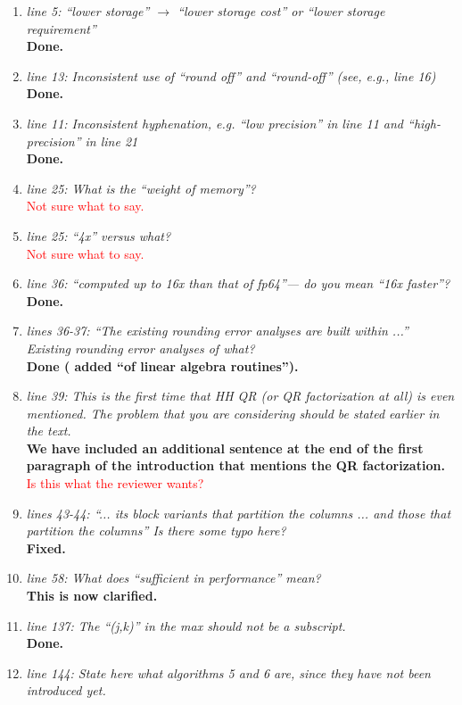 \documentclass[final,onefignum,onetabnum]{siamart190516}
\newcommand{\red}[1]{\textcolor{red}{#1}}
\begin{document}
\begin{enumerate}
    \item {\it line 5: ``lower storage'' $\rightarrow$ ``lower storage cost'' or ``lower storage requirement'' }\\
    {\bf Done.}
    \item {\it line 13: Inconsistent use of ``round off'' and ``round-off'' (see, e.g., line 16) }\\
    {\bf Done.}
    \item {\it line 11: Inconsistent hyphenation, e.g. ``low precision'' in line 11 and ``high-precision'' in line 21 }\\
    {\bf Done.}
    \item {\it line 25: What is the ``weight of memory''? }\\
    \red{Not sure what to say.}
    \item {\it line 25: ``4x'' versus what? }\\
    \red{Not sure what to say.}
    \item {\it line 36: ``computed up to 16x than that of fp64''--- do you mean ``16x faster''? }\\
    {\bf Done.}
    \item {\it lines 36-37: ``The existing rounding error analyses are built within ...'' Existing rounding error analyses of what? }\\
    {\bf Done ( added ``of linear algebra routines'').}
    \item {\it line 39: This is the first time that HH QR (or QR factorization at all) is even mentioned. The problem that you are considering should be stated earlier in the text. }\\
    {\bf We have included an additional sentence at the end of the first paragraph of the introduction that mentions the QR factorization.}
    \red{Is this what the reviewer wants?}
    \item {\it lines 43-44: ``... its block variants that partition the columns ... and those that partition the columns'' Is there some typo here? }\\
    {\bf Fixed.}
    \item {\it line 58: What does ``sufficient in performance'' mean? }\\
    {\bf This is now clarified.}
    \item {\it line 137: The ``(j,k)'' in the max should not be a subscript. }\\
    {\bf Done.}
    \item {\it line 144: State here what algorithms 5 and 6 are, since they have not been introduced yet. }\\

\end{enumerate}
\end{document}
